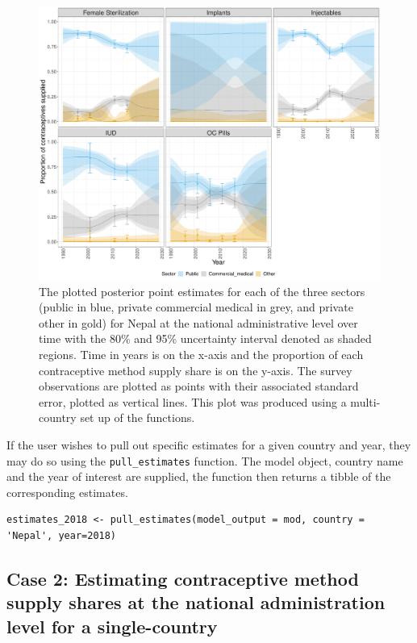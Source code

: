 \begin{figure}[H]
\includegraphics[width=1\linewidth,height=0.4\textheight]{figures/fig_3} \caption{The plotted posterior point estimates for each of the three sectors (public in blue, private commercial medical in grey, and private other in gold) for Nepal at the national administrative level over time with the 80\% and 95\% uncertainty interval denoted as shaded regions. Time in years is on the x-axis and the proportion of each contraceptive method supply share is on the y-axis. The survey observations are plotted as points with their associated standard error, plotted as vertical lines. This plot was produced using a multi-country set up of the  functions.}\label{fig:fig-3}
\end{figure}

If the user wishes to pull out specific estimates for a given country and year, they may do so using the \texttt{pull\_estimates} function. The model object, country name and the year of interest are supplied, the function then returns a tibble of the corresponding estimates.

\begin{verbatim}
estimates_2018 <- pull_estimates(model_output = mod, country = 'Nepal', year=2018)
\end{verbatim}

\subsection{Case 2: Estimating contraceptive method supply shares at the national administration level for a single-country}\label{case-2-estimating-contraceptive-method-supply-shares-at-the-national-administration-level-for-a-single-country}

